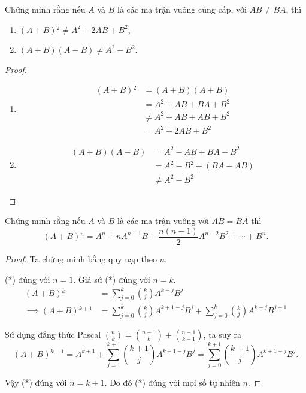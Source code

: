 \begin{exercise}
    Chứng minh rằng nếu $A$ và $B$ là các ma trận vuông cùng cấp, với $AB\ne BA$, thì
    \begin{enumerate}[label = (\alph*)]
        \item $(A+B){}^{2}\ne A^{2} + 2AB + B^{2}$,
        \item $(A+B)(A-B)\ne A^{2} - B^{2}$.
    \end{enumerate}
\end{exercise}

\begin{proof}
    \begin{enumerate}[label = (\alph*)]
        \item
              \begin{align*}
                  (A+B){}^{2} & = (A+B)(A+B)                \\
                              & = A^{2} + AB + BA + B^{2}   \\
                              & \ne A^{2} + AB + AB + B^{2} \\
                              & = A^{2} + 2AB + B^{2}
              \end{align*}
        \item
              \begin{align*}
                  (A+B)(A-B) & = A^{2} - AB + BA - B^{2}   \\
                             & = A^{2} - B^{2} + (BA - AB) \\
                             & \ne A^{2} - B^{2}
              \end{align*}
    \end{enumerate}
\end{proof}

\begin{exercise}
    Chứng minh rằng nếu $A$ và $B$ là các ma trận vuông với $AB = BA$ thì
    \[
        (A+B){}^{n} = A^{n} + nA^{n-1}B + \frac{n(n-1)}{2}A^{n-2}B^{2} + \cdots + B^{n}.
        \tag{*}
    \]
\end{exercise}

\begin{proof}Ta chứng minh bằng quy nạp theo $n$.
    
    (*) đúng với $n = 1$. Giả sử (*) đúng với $n = k$.
    \begin{align*}
        (A+B){}^{k}               & = \sum^{k}_{j=0}\binom{k}{j}A^{k-j}B^{j}                      \\
        \implies (A+B){}^{k+1} & = \sum^{k}_{j=0}\binom{k}{j}A^{k+1-j}B^{j} + \sum^{k}_{j=0}\binom{k}{j}A^{k-j}B^{j+1}
    \end{align*}
    
    Sử dụng đẳng thức Pascal $\binom{n}{k} = \binom{n-1}{k} + \binom{n-1}{k-1}$, ta suy ra
    \[
        (A+B){}^{k+1} = A^{k+1} + \sum^{k+1}_{j=1}\binom{k+1}{j}A^{k+1-j}B^{j} = \sum^{k+1}_{j=0}\binom{k+1}{j}A^{k+1-j}B^{j}.
    \]
    
    Vậy (*) đúng với $n = k + 1$. Do đó (*) đúng với mọi số tự nhiên $n$.
\end{proof}

